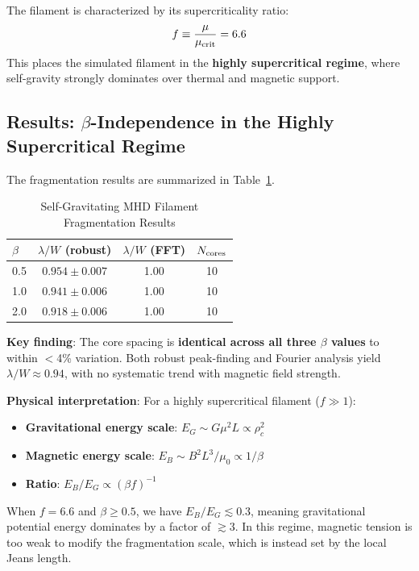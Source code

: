 \documentclass[11pt,a4paper]{article}
\begin{document}
The filament is characterized by its supercriticality ratio:
\begin{equation}
f \equiv \frac{\mu}{\mu_{\rm crit}} = 6.6
\end{equation}
This places the simulated filament in the \textbf{highly supercritical regime}, where self-gravity strongly dominates over thermal and magnetic support.

\subsection{Results: $\beta$-Independence in the Highly Supercritical Regime}

The fragmentation results are summarized in Table~\ref{tab:mhd_sg}.

\begin{table}[H]
\centering
\caption{Self-Gravitating MHD Filament Fragmentation Results}
\label{tab:mhd_sg}
\begin{tabular}{lccc}
\toprule
$\beta$ & $\lambda/W$ (robust) & $\lambda/W$ (FFT) & $N_{\rm cores}$ \\
\midrule
0.5 & $0.954 \pm 0.007$ & 1.00 & 10 \\
1.0 & $0.941 \pm 0.006$ & 1.00 & 10 \\
2.0 & $0.918 \pm 0.006$ & 1.00 & 10 \\
\bottomrule
\end{tabular}
\end{table}

\textbf{Key finding}: The core spacing is \textbf{identical across all three $\beta$ values} to within $<$4\% variation. Both robust peak-finding and Fourier analysis yield $\lambda/W \approx 0.94$, with no systematic trend with magnetic field strength.

\textbf{Physical interpretation}: For a highly supercritical filament ($f \gg 1$):
\begin{itemize}
    \item \textbf{Gravitational energy scale}: $E_G \sim G \mu^2 L \propto \rho_c^2$
    \item \textbf{Magnetic energy scale}: $E_B \sim B^2 L^3 / \mu_0 \propto 1/\beta$
    \item \textbf{Ratio}: $E_B / E_G \propto (\beta f)^{-1}$
\end{itemize}
When $f = 6.6$ and $\beta \geq 0.5$, we have $E_B / E_G \lesssim 0.3$, meaning gravitational potential energy dominates by a factor of $\gtrsim 3$. In this regime, magnetic tension is too weak to modify the fragmentation scale, which is instead set by the local Jeans length.
\end{document}
